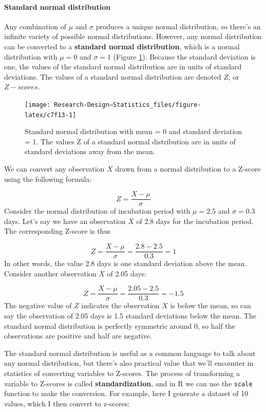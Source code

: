 \documentclass[
]{book}
\begin{document}
\paragraph{Standard normal distribution}\label{standard-normal-distribution}

Any combination of \(\mu\) and \(\sigma\) produces a unique normal distribution, so there's an infinite variety of possible normal distributions. However, any normal distribution can be converted to a \textbf{standard normal distribution}, which is a normal distribution with \(\mu = 0\) and \(\sigma = 1\) (Figure \ref{fig:c7f13}). Because the standard deviation is one, the values of the standard normal distribution are in units of standard deviations. The values of a standard normal distribution are denoted \(Z\), or \(Z-scores\).

\begin{figure}

{\centering \texttt{[image: Research-Design---Statistics\_files/figure-latex/c7f13-1]} 

}

\caption{Standard normal distribution with mean = 0 and standard deviation = 1. The values Z of a standard normal distribution are in units of standard deviations away from the mean.}\label{fig:c7f13}
\end{figure}

We can convert any observation \(X\) drawn from a normal distribution to a Z-score using the following formula:

\[
Z = \frac{X-\mu}{\sigma}
\]
Consider the normal distribution of incubation period with \(\mu = 2.5\) and \(\sigma=0.3\) days. Let's say we have an observation \(X\) of 2.8 days for the incubation period. The corresponding Z-score is thus

\[
Z = \frac{X-\mu}{\sigma} =\frac{2.8-2.5}{0.3}=1 
\]
In other words, the value 2.8 days is one standard deviation above the mean. Consider another observation \(X\) of 2.05 days:

\[
Z = \frac{X-\mu}{\sigma} =\frac{2.05-2.5}{0.3}=-1.5
\]
The negative value of \(Z\) indicates the observation \(X\) is below the mean, so can say the observation of 2.05 days is 1.5 standard deviations below the mean. The standard normal distribution is perfectly symmetric around 0, so half the observations are positive and half are negative.

The standard normal distribution is useful as a common language to talk about any normal distribution, but there's also practical value that we'll encounter in statistics of converting variables to Z-scores. The process of transforming a variable to Z-scores is called \textbf{standardization}, and in R we can use the \texttt{scale} function to make the conversion. For example, here I generate a dataset of 10 values, which I then convert to z-scores:
\end{document}
